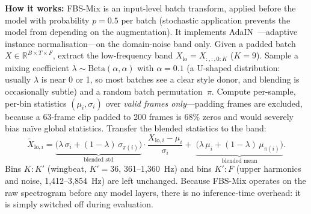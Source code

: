 \textbf{How it works:}
FBS-Mix is an input-level batch transform, applied before the model
with probability $p{=}0.5$ per batch (stochastic application
prevents the model from depending on the augmentation).
It implements AdaIN~\cite{huang2017adain}---adaptive instance
normalisation---on the domain-noise band only.
Given a padded batch $X \in \mathbb{R}^{B \times T \times F}$, extract
the low-frequency band $X_{\mathrm{lo}} = X_{:,:,0:K}$ ($K{=}9$).
Sample a mixing coefficient $\lambda \sim \mathrm{Beta}(\alpha,\alpha)$
with $\alpha{=}0.1$ (a U-shaped distribution: usually $\lambda$ is near
0 or 1, so most batches see a clear style donor, and blending is
occasionally subtle) and a random batch permutation~$\pi$.
Compute per-sample, per-bin statistics $(\mu_i,\sigma_i)$ over
\emph{valid frames only}---padding frames are excluded, because a
63-frame clip padded to 200 frames is 68\% zeros and would severely
bias na\"ive global statistics.
Transfer the blended statistics to the band:
\begin{equation}
  \tilde{X}_{\mathrm{lo},i} =
    \underbrace{\bigl(\lambda\,\sigma_i + (1{-}\lambda)\,\sigma_{\pi(i)}\bigr)}_{\text{blended std}}
    \cdot \frac{X_{\mathrm{lo},i} - \mu_i}{\sigma_i}
    +\; \underbrace{\bigl(\lambda\,\mu_i + (1{-}\lambda)\,\mu_{\pi(i)}\bigr)}_{\text{blended mean}}.
  \label{eq:fbsmix}
\end{equation}
Bins $K{:}K'$ (wingbeat, $K'{=}36$, 361--1{,}360~Hz) and bins
$K'{:}F$ (upper harmonics and noise, 1{,}412--3{,}854~Hz) are left
unchanged.
Because FBS-Mix operates on the raw spectrogram before any model
layers, there is no inference-time overhead: it is simply switched
off during evaluation.
